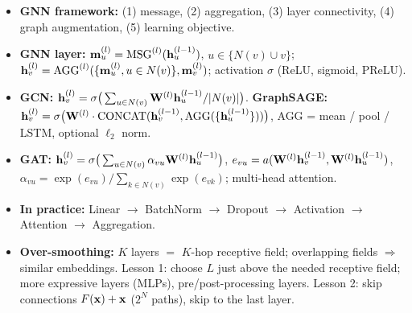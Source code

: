 \bigskip{}
{}
\begin{summarybox}
  \begin{itemize}
    \item \textbf{GNN framework:} (1) message, (2) aggregation, (3) layer
      connectivity, (4) graph augmentation, (5) learning objective.
    \item \textbf{GNN layer:} $\mathbf{m}_u^{(l)}=\operatorname{MSG}^{(l)}(\mathbf{h}_u^{(l-1)})$,
      $u\in\{N(v)\cup v\}$; $\mathbf{h}_v^{(l)}=\operatorname{AGG}^{(l)}(\{\mathbf{m}_u^{(l)},u\in N(v)\},\mathbf{m}_v^{(l)})$;
      activation $\sigma$ (ReLU, sigmoid, PReLU).
    \item \textbf{GCN:} $\mathbf{h}_v^{(l)}=\sigma\big(\sum_{u\in N(v)}\mathbf{W}^{(l)}\mathbf{h}_u^{(l-1)}/|N(v)|\big)$.
      \textbf{GraphSAGE:} $\mathbf{h}_v^{(l)}=\sigma\big(\mathbf{W}^{(l)}\cdot\operatorname{CONCAT}(\mathbf{h}_v^{(l-1)},
      \operatorname{AGG}(\{\mathbf{h}_u^{(l-1)}\}))\big)$, AGG = mean / pool / LSTM, optional $\ell_2$ norm.
    \item \textbf{GAT:} $\mathbf{h}_v^{(l)}=\sigma\big(\sum_{u\in N(v)}\alpha_{vu}\mathbf{W}^{(l)}\mathbf{h}_u^{(l-1)}\big)$,
      $e_{vu}=a(\mathbf{W}^{(l)}\mathbf{h}_v^{(l-1)},\mathbf{W}^{(l)}\mathbf{h}_u^{(l-1)})$,
      $\alpha_{vu}=\exp(e_{vu})/\sum_{k\in N(v)}\exp(e_{vk})$; multi-head attention.
    \item \textbf{In practice:} Linear $\to$ BatchNorm $\to$ Dropout $\to$
      Activation $\to$ Attention $\to$ Aggregation.
    \item \textbf{Over-smoothing:} $K$ layers $=$ $K$-hop receptive field;
      overlapping fields $\Rightarrow$ similar embeddings. Lesson 1: choose $L$
      just above the needed receptive field; more expressive layers (MLPs),
      pre/post-processing layers. Lesson 2: skip connections $F(\mathbf{x})+\mathbf{x}$
      ($2^N$ paths), skip to the last layer.
  \end{itemize}
\end{summarybox}
